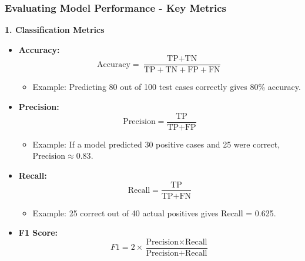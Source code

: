 \documentclass{beamer}
\begin{document}
\begin{frame}[fragile]
    \frametitle{Evaluating Model Performance - Key Metrics}
    \textbf{1. Classification Metrics}
    \begin{itemize}
        \item \textbf{Accuracy:} 
        \begin{equation}
            \text{Accuracy} = \frac{\text{TP} + \text{TN}}{\text{TP} + \text{TN} + \text{FP} + \text{FN}}
        \end{equation}
        \begin{itemize}
            \item Example: Predicting 80 out of 100 test cases correctly gives 80\% accuracy.
        \end{itemize}
        
        \item \textbf{Precision:} 
        \begin{equation}
            \text{Precision} = \frac{\text{TP}}{\text{TP} + \text{FP}}
        \end{equation}
        \begin{itemize}
            \item Example: If a model predicted 30 positive cases and 25 were correct, $\text{Precision} \approx 0.83$.
        \end{itemize}

        \item \textbf{Recall:} 
        \begin{equation}
            \text{Recall} = \frac{\text{TP}}{\text{TP} + \text{FN}}
        \end{equation}
        \begin{itemize}
            \item Example: 25 correct out of 40 actual positives gives Recall = 0.625.
        \end{itemize}

        \item \textbf{F1 Score:} 
        \begin{equation}
            F1 = 2 \times \frac{\text{Precision} \times \text{Recall}}{\text{Precision} + \text{Recall}}
        \end{equation}
    \end{itemize}
\end{frame}
\end{document}
